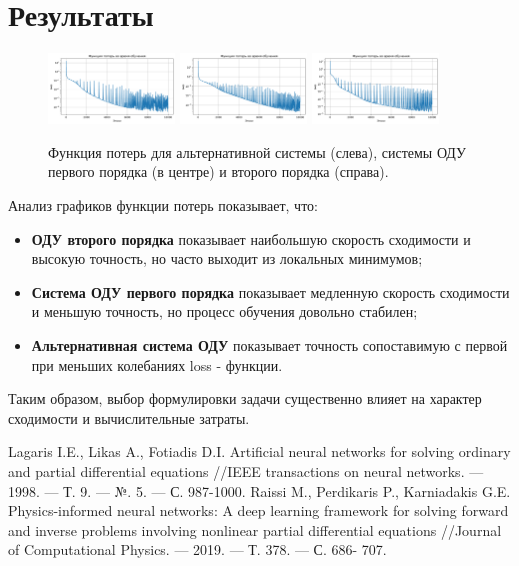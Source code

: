 \documentclass[oneside, a5paper,10pt]{article}
\begin{document}
\section*{Результаты}
\begin{figure}[H]
    \centering
    \includegraphics[width=0.3\textwidth]{../images/Loss_alt_ODE.png}
    \includegraphics[width=0.3\textwidth]{../images/Loss_ODE_of_the_first_order.png}
    \includegraphics[width=0.3\textwidth]{../images/Loss_ODE_of_the_second_order.png}
    \caption{Функция потерь для альтернативной системы (слева), системы ОДУ первого порядка (в центре) и второго порядка (справа).}
\end{figure}

Анализ графиков функции потерь показывает, что:
\begin{itemize}
    \item \textbf{ОДУ второго порядка} показывает наибольшую скорость сходимости и высокую точность, но часто выходит из локальных минимумов;
    \item \textbf{Система ОДУ первого порядка} показывает медленную скорость сходимости и меньшую точность, но процесс обучения довольно стабилен;
    \item \textbf{Альтернативная система ОДУ} показывает точность сопоставимую с первой при меньших колебаниях loss - функции.
\end{itemize}

Таким образом, выбор формулировки задачи существенно влияет на характер сходимости и вычислительные затраты.

\begin{thebibliography}{9}
     Lagaris I.E., Likas A., Fotiadis D.I. Artificial neural networks for solving ordinary and
    partial differential equations //IEEE transactions on neural networks. — 1998. — Т. 9. — №. 5. — С. 987-1000.
     Raissi M., Perdikaris P., Karniadakis G.E. Physics-informed neural networks: A deep
    learning framework for solving forward and inverse problems involving nonlinear partial
    differential equations //Journal of Computational Physics. — 2019. — Т. 378. — С. 686-
    707.
\end{thebibliography}
\end{document}
